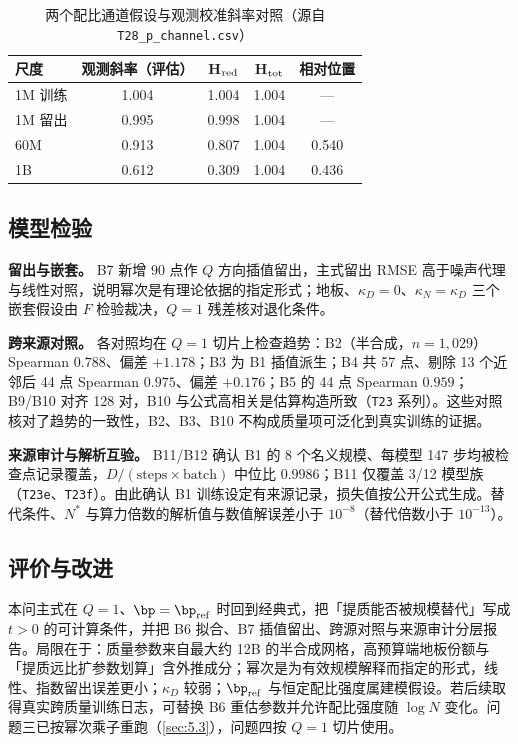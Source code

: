 \begin{table}[H]
\centering\small
\caption{两个配比通道假设与观测校准斜率对照（源自 \texttt{T28\_p\_channel.csv}）}
\label{tab:q2pchannel}
\begin{tabularx}{\textwidth}{@{}l c c c c@{}}
\toprule
尺度 & 观测斜率（评估） & H$_{\rm red}$ & H$_{\rm tot}$ & 相对位置 \\
\midrule
1M 训练 & 1.004 & 1.004 & 1.004 & — \\
1M 留出 & 0.995 & 0.998 & 1.004 & — \\
60M & 0.913 & 0.807 & 1.004 & 0.540 \\
1B & 0.612 & 0.309 & 1.004 & 0.436 \\
\bottomrule
\end{tabularx}
\end{table}

\subsection{模型检验}
\label{sec:5.3.8}

\textbf{留出与嵌套。} B7 新增 90 点作 $Q$ 方向插值留出，主式留出 RMSE 高于噪声代理与线性对照，说明幂次是有理论依据的指定形式；地板、$\kappa_D=0$、$\kappa_N=\kappa_D$ 三个嵌套假设由 $F$ 检验裁决，$Q=1$ 残差核对退化条件。

\textbf{跨来源对照。} 各对照均在 $Q=1$ 切片上检查趋势：B2（半合成，$n=1{,}029$）Spearman $0.788$、偏差 $+1.178$；B3 为 B1 插值派生；B4 共 57 点、剔除 13 个近邻后 44 点 Spearman $0.975$、偏差 $+0.176$；B5 的 44 点 Spearman $0.959$；B9/B10 对齐 128 对，B10 与公式高相关是估算构造所致（\texttt{T23} 系列）。这些对照核对了趋势的一致性，B2、B3、B10 不构成质量项可泛化到真实训练的证据。

\textbf{来源审计与解析互验。} B11/B12 确认 B1 的 8 个名义规模、每模型 147 步均被检查点记录覆盖，$D/(\text{steps}\times\text{batch})$ 中位比 $0.9986$；B11 仅覆盖 3/12 模型族（\texttt{T23e}、\texttt{T23f}）。由此确认 B1 训练设定有来源记录，损失值按公开公式生成。替代条件、$N^*$ 与算力倍数的解析值与数值解误差小于 $10^{-8}$（替代倍数小于 $10^{-13}$）。

\subsection{评价与改进}
\label{sec:5.3.9}

本问主式在 $Q=1$、$\bp=\bp_{\rm ref}$ 时回到经典式，把「提质能否被规模替代」写成 $t>0$ 的可计算条件，并把 B6 拟合、B7 插值留出、跨源对照与来源审计分层报告。局限在于：质量参数来自最大约 12B 的半合成网格，高预算端地板份额与「提质远比扩参数划算」含外推成分；幂次是为有效规模解释而指定的形式，线性、指数留出误差更小；$\kappa_D$ 较弱；$\bp_{\rm ref}$ 与恒定配比强度属建模假设。若后续取得真实跨质量训练日志，可替换 B6 重估参数并允许配比强度随 $\log N$ 变化。问题三已按幂次乘子重跑（\ref{sec:5.3}），问题四按 $Q=1$ 切片使用。
